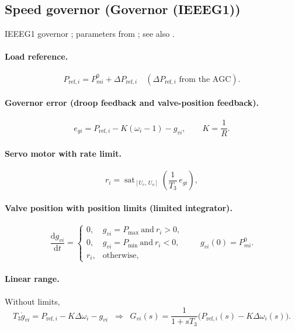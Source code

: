 \documentclass[11pt,a4paper]{article}
\numberwithin{equation}{section}
\newcommand{\sat}{\operatorname{sat}}
\newcommand{\dd}{\mathrm{d}}
\newcommand{\blk}[1]{\textsf{#1}}
\begin{document}
\subsection{Speed governor (\blk{Governor (IEEEG1)})}
IEEEG1 governor \cite{IEEE1973,PESTR1}; parameters from \cite[Table~7]{RA2021access}; see also \cite[Ch.~9]{Kundur1994}.
\paragraph{Load reference.}
\begin{equation}
P_{\text{ref},i} = P_{mi}^0 + \Delta P_{\text{ref},i}\quad(\Delta P_{\text{ref},i}\text{ from the AGC}).
\end{equation}
\paragraph{Governor error (droop feedback and valve-position feedback).}
\begin{equation}
e_{gi} = P_{\text{ref},i} - K(\omega_i - 1) - g_{vi},\qquad K = \frac{1}{R} .
\end{equation}
\paragraph{Servo motor with rate limit.}
\begin{equation}
r_i = \sat_{[U_c,\,U_o]}\!\left(\frac{1}{T_3}\,e_{gi}\right),
\end{equation}
\paragraph{Valve position with position limits (limited integrator).}
\begin{equation}
\boxed{\frac{\dd g_{vi}}{\dd t} =
\begin{cases}
0, & g_{vi}=P_{\max}\ \text{and}\ r_i>0,\\
0, & g_{vi}=P_{\min}\ \text{and}\ r_i<0,\\
r_i, & \text{otherwise},
\end{cases}
\qquad g_{vi}(0)=P_{mi}^0 .}
\end{equation}
\paragraph{Linear range.} Without limits,
\begin{equation}
T_3\dot g_{vi} = P_{\text{ref},i} - K\Delta\omega_i - g_{vi}
\;\;\Longrightarrow\;\;
G_{vi}(s) = \frac{1}{1+sT_3}\big(P_{\text{ref},i}(s) - K\Delta\omega_i(s)\big).
\end{equation}
\end{document}
